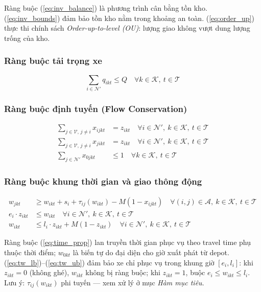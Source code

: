 \documentclass[12pt,a4paper]{article}
\newcommand{\T}{\mathcal{T}}
\newcommand{\N}{\mathcal{N}}
\newcommand{\K}{\mathcal{K}}
\newcommand{\V}{\mathcal{V}}
\newcommand{\A}{\mathcal{A}}
\newcommand{\tij}{\tau_{ij}}
\begin{document}
\noindent Ràng buộc (\ref{eq:inv_balance}) là phương trình cân bằng tồn kho.
(\ref{eq:inv_bounds}) đảm bảo tồn kho nằm trong khoảng an toàn.
(\ref{eq:order_up}) thực thi chính sách \textit{Order-up-to-level (OU)}: lượng giao
không vượt dung lượng trống của kho.

\subsubsection{Ràng buộc tải trọng xe}

\begin{equation}
  \sum_{i \in \N'} q_{ikt} \leq Q \quad \forall k \in \K,\ t \in \T
  \label{eq:capacity}
\end{equation}

\subsubsection{Ràng buộc định tuyến (Flow Conservation)}

\begin{align}
  \sum_{j \in \V,\, j \neq i} x_{ijkt} &= z_{ikt}
    \quad \forall i \in \N',\ k \in \K,\ t \in \T
    \label{eq:flow_out} \\
  \sum_{j \in \V,\, j \neq i} x_{jikt} &= z_{ikt}
    \quad \forall i \in \N',\ k \in \K,\ t \in \T
    \label{eq:flow_in} \\
  \sum_{j \in \N'} x_{0jkt} &\leq 1
    \quad \forall k \in \K,\ t \in \T
    \label{eq:depot_out}
\end{align}

\subsubsection{Ràng buộc khung thời gian và giao thông động}

\begin{align}
  w_{jkt} &\geq w_{ikt} + s_i + \tij(w_{ikt}) - M(1 - x_{ijkt})
    \quad \forall (i,j) \in \A,\ k \in \K,\ t \in \T
    \label{eq:time_prop} \\
  e_i \cdot z_{ikt} &\leq w_{ikt}
    \quad \forall i \in \N',\ k \in \K,\ t \in \T
    \label{eq:tw_lb} \\
  w_{ikt} &\leq l_i \cdot z_{ikt} + M(1 - z_{ikt})
    \quad \forall i \in \N',\ k \in \K,\ t \in \T
    \label{eq:tw_ub}
\end{align}

\noindent Ràng buộc (\ref{eq:time_prop}) lan truyền thời gian phục vụ theo travel time
phụ thuộc thời điểm; $w_{0kt}$ là biến tự do đại diện cho giờ xuất phát từ depot.
(\ref{eq:tw_lb})--(\ref{eq:tw_ub}) đảm bảo xe chỉ phục vụ trong khung giờ $[e_i, l_i]$:
khi $z_{ikt}=0$ (không ghé), $w_{ikt}$ không bị ràng buộc; khi $z_{ikt}=1$, buộc
$e_i \leq w_{ikt} \leq l_i$. Lưu ý: $\tij(w_{ikt})$ phi tuyến --- xem xử lý ở mục
\textit{Hàm mục tiêu}.
\end{document}
